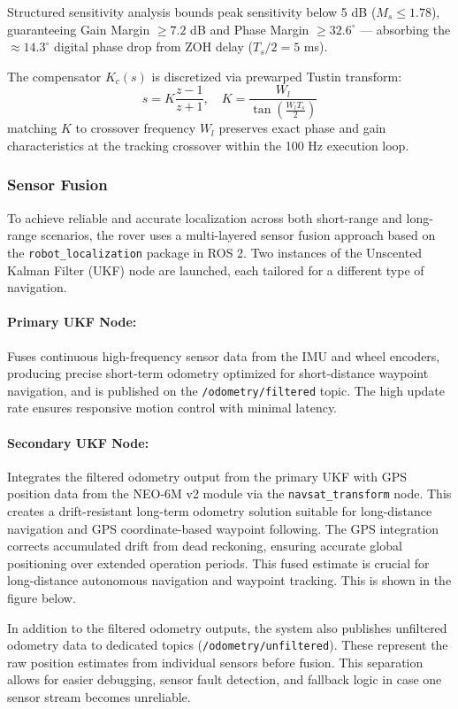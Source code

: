 \documentclass[12pt,a4paper,twocolumn]{article}
\begin{document}
Structured sensitivity analysis bounds peak sensitivity below 5 dB ($M_s \le 1.78$), guaranteeing Gain Margin $\ge 7.2$ dB and Phase Margin $\ge 32.6^\circ$ — absorbing the $\approx 14.3^\circ$ digital phase drop from ZOH delay ($T_s/2 = 5$ ms).

The compensator $K_c(s)$ is discretized via prewarped Tustin transform:
\begin{equation}
s = K \frac{z - 1}{z + 1}, \quad K = \frac{W_l}{\tan\left(\frac{W_l T_s}{2}\right)}
\end{equation}
matching $K$ to crossover frequency $W_l$ preserves exact phase and gain characteristics at the tracking crossover within the 100 Hz execution loop.
\subsubsection{Sensor Fusion}
To achieve reliable and accurate localization across both short-range and long-range scenarios, the rover uses a multi-layered sensor fusion approach based on the \texttt{robot\_localization} package in ROS 2. Two instances of the Unscented Kalman Filter (UKF) node are launched, each tailored for a different type of navigation.

\paragraph{Primary UKF Node:}
Fuses continuous high-frequency sensor data from the IMU and wheel encoders, producing precise short-term odometry optimized for short-distance waypoint navigation, and is published on the \texttt{/odometry/filtered} topic.
The high update rate ensures responsive motion control with minimal latency.

\paragraph{Secondary UKF Node:}
Integrates the filtered odometry output from the primary UKF with GPS position data from the NEO-6M v2 module via the \texttt{navsat\_transform} node. This creates a drift-resistant long-term odometry solution suitable for long-distance navigation and GPS coordinate-based waypoint following. The GPS integration corrects accumulated drift from dead reckoning, ensuring accurate global positioning over extended operation periods. This fused estimate is crucial for long-distance autonomous navigation and waypoint tracking. This is shown in the figure below.

In addition to the filtered odometry outputs, the system also publishes unfiltered odometry data to dedicated topics (\texttt{/odometry/unfiltered}). These represent the raw position estimates from individual sensors before fusion. This separation allows for easier debugging, sensor fault detection, and fallback logic in case one sensor stream becomes unreliable.
\end{document}
